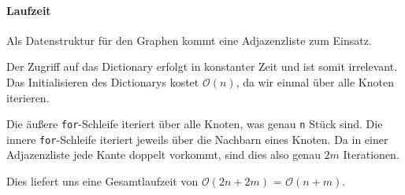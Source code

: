 \documentclass[12pt]{scrartcl}%
\theoremstyle{nonumberplain}
\newcommand{\bO}[1]{\mathcal O(#1)}
\newcommand{\code}[1]{\lstinline[basicstyle=\ttfamily\color{black}]{#1}}
\begin{document}
\paragraph{Laufzeit}
Als Datenstruktur für den Graphen kommt eine Adjazenzliste zum Einsatz.

Der Zugriff auf das Dictionary erfolgt in konstanter Zeit und ist somit irrelevant.
Das Initialisieren des Dictionarys kostet $\bO{n}$, da wir einmal über alle Knoten iterieren.

Die äußere \code{for}-Schleife iteriert über alle Knoten, was genau \code{n} Stück sind. Die innere \code{for}-Schleife iteriert jeweils über die Nachbarn eines Knoten. Da in einer Adjazenzliste jede Kante doppelt vorkommt, sind dies also genau $2m$ Iterationen.

Dies liefert uns eine Gesamtlaufzeit von $\bO{2n + 2m}$ = $\bO{n + m}$.
\end{document}
